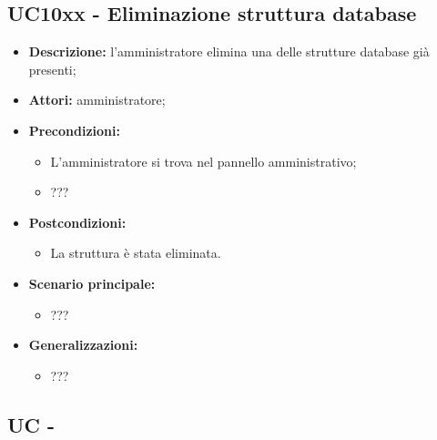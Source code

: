 \documentclass[5pt]{article}
\begin{document}
\subsection{UC10xx - Eliminazione struttura database}
\label{sec:10xxx}
\begin{itemize}
    \item \textbf{Descrizione:}  l’amministratore elimina una delle strutture database già presenti;
    \item \textbf{Attori:} amministratore;
    \item \textbf{Precondizioni:} 
    \begin{itemize}
        \item L’amministratore si trova nel pannello amministrativo;
        \item ???
    \end{itemize}
    \item \textbf{Postcondizioni:} 
    \begin{itemize}
        \item La struttura è stata eliminata.
    \end{itemize}
    \item \textbf{Scenario principale:} 
    \begin{itemize}
        \item ???
    \end{itemize}
    \item \textbf{Generalizzazioni:} 
    \begin{itemize}
        \item ???
    \end{itemize}
\end{itemize}

\subsection{UC - }
\label{sec:UC}
\end{document}
